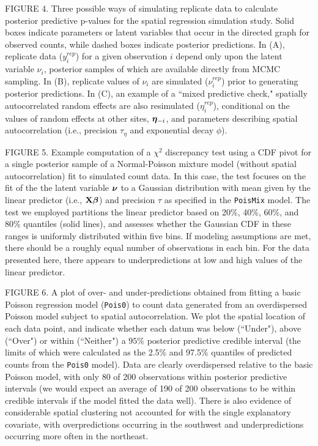 \documentclass[12pt,english]{article}
\begin{document}
\begin{spacing}{1.9}
FIGURE 4.  Three possible ways of simulating replicate data to
calculate posterior predictive p-values for the spatial regression
simulation study. Solid boxes indicate parameters or latent variables
that occur in the directed graph for observed counts, while dashed
boxes indicate posterior predictions.  In (A), replicate data
($y_i^{rep}$) for a given observation $i$ depend only upon the latent
variable $\nu_i$, posterior samples of which are available directly
from MCMC sampling.  In (B), replicate values of $\nu_i$ are simulated
($\nu_i^{rep}$) prior to generating posterior predictions.  In (C), an
example of a ``mixed predictive check," spatially autocorrelated
random effects are also resimulated ($\eta_i^{rep}$), conditional on
the values of random effects at other sites, $\boldsymbol{\eta}_{-i}$, and
parameters describing spatial autocorrelation (i.e., precision
$\tau_\eta$ and exponential decay $\phi$).

FIGURE 5.  Example computation of a $\chi^2$ discrepancy test using a
CDF pivot for a single posterior sample of a Normal-Poisson mixture
model (without spatial autocorrelation) fit to simulated count data.
In this case, the test focuses on the fit of the the latent variable
$\boldsymbol{\nu}$ to a Gaussian distribution with mean given by the linear
predictor (i.e., ${\bf X}\boldsymbol{\beta}$) and precision $\tau$ as specified in
the \texttt{PoisMix} model. The test we employed partitions the linear
predictor based on 20\%, 40\%, 60\%, and 80\% quantiles (solid lines),
and assesses whether the Gaussian CDF in these ranges is uniformly
distributed within five bins.  If modeling assumptions are met, there
should be a roughly equal number of observations in each bin.  For the
data presented here, there appears to underpredictions at low and high
values of the linear predictor.

FIGURE 6. A plot of over- and under-predictions obtained from fitting a basic Poisson
regression model (\texttt{Pois0}) to count data generated from an overdispersed Poisson model subject to
spatial autocorrelation.  We plot the spatial location of each data point, and indicate
whether each datum was below (``Under"), above (``Over") or within (``Neither") a $95\%$ posterior
predictive credible interval (the limits of which were calculated as the 2.5\% and 97.5\% quantiles of predicted counts
from the \texttt{Pois0} model).  Data are clearly overdispersed relative to the basic Poisson model, with only 80 of 200 observations
within posterior predictive intervals (we would expect an average of 190 of 200 observations to be within credible intervals if the model
fitted the data well).  There is also evidence of considerable spatial clustering not accounted for with the
single explanatory covariate, with overpredictions occurring in the southwest and underpredictions occurring more often in the northeast.


\end{spacing}
\end{document}
